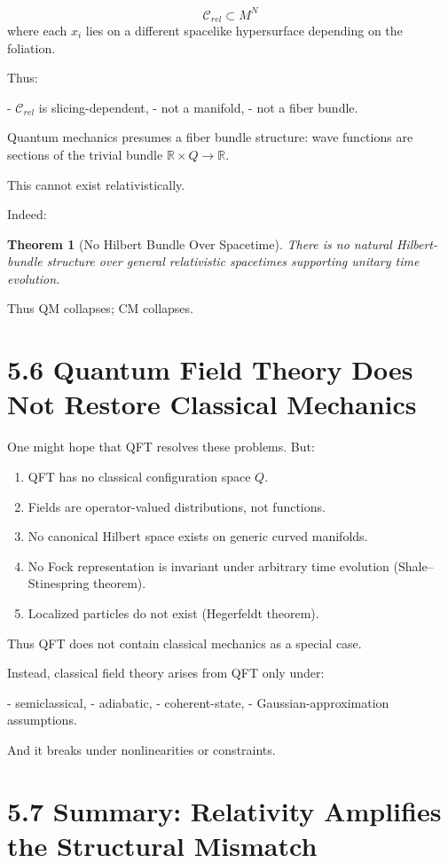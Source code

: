 \documentclass[12pt,oneside]{book}
\theoremstyle{plain}
\newtheorem{theorem}{Theorem}[chapter]
\theoremstyle{definition}
\begin{document}
\[
\mathcal{C}_{rel} \subset M^N
\]
where each $x_i$ lies on a different spacelike hypersurface depending on the foliation.

Thus:

- $\mathcal{C}_{rel}$ is slicing-dependent,
- not a manifold,
- not a fiber bundle.

Quantum mechanics presumes a fiber bundle structure:  
wave functions are sections of the trivial bundle $\mathbb{R} \times Q \to \mathbb{R}$.

This cannot exist relativistically.

Indeed:

\begin{theorem}[No Hilbert Bundle Over Spacetime]
There is no natural Hilbert-bundle structure over general relativistic spacetimes supporting unitary time evolution.
\end{theorem}

Thus QM collapses; CM collapses.

\section{5.6 Quantum Field Theory Does Not Restore Classical Mechanics}

One might hope that QFT resolves these problems.  
But:

\begin{enumerate}
\item QFT has no classical configuration space $Q$.  
\item Fields are operator-valued distributions, not functions.  
\item No canonical Hilbert space exists on generic curved manifolds.  
\item No Fock representation is invariant under arbitrary time evolution (Shale–Stinespring theorem).  
\item Localized particles do not exist (Hegerfeldt theorem).  
\end{enumerate}

Thus QFT does not contain classical mechanics as a special case.

Instead, classical field theory arises from QFT only under:

- semiclassical,
- adiabatic,
- coherent-state,
- Gaussian-approximation assumptions.

And it breaks under nonlinearities or constraints.

\section{5.7 Summary: Relativity Amplifies the Structural Mismatch}
\end{document}
